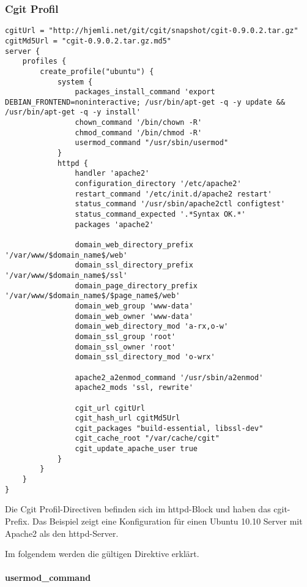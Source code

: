 \subsubsection{Cgit Profil}

\begin{lstlisting}[style=Java, caption=Beispiel Cgit Profil]
cgitUrl = "http://hjemli.net/git/cgit/snapshot/cgit-0.9.0.2.tar.gz"
cgitMd5Url = "cgit-0.9.0.2.tar.gz.md5"
server {
    profiles {
        create_profile("ubuntu") {
            system {
                packages_install_command 'export DEBIAN_FRONTEND=noninteractive; /usr/bin/apt-get -q -y update && /usr/bin/apt-get -q -y install'
                chown_command '/bin/chown -R'
                chmod_command '/bin/chmod -R'
                usermod_command "/usr/sbin/usermod"
            }
            httpd {
                handler 'apache2'
                configuration_directory '/etc/apache2'
                restart_command '/etc/init.d/apache2 restart'
                status_command '/usr/sbin/apache2ctl configtest'
                status_command_expected '.*Syntax OK.*'
                packages 'apache2'

                domain_web_directory_prefix '/var/www/$domain_name$/web'
                domain_ssl_directory_prefix '/var/www/$domain_name$/ssl'
                domain_page_directory_prefix '/var/www/$domain_name$/$page_name$/web'
                domain_web_group 'www-data'
                domain_web_owner 'www-data'
                domain_web_directory_mod 'a-rx,o-w'
                domain_ssl_group 'root'
                domain_ssl_owner 'root'
                domain_ssl_directory_mod 'o-wrx'

                apache2_a2enmod_command '/usr/sbin/a2enmod'
                apache2_mods 'ssl, rewrite'

                cgit_url cgitUrl
                cgit_hash_url cgitMd5Url
                cgit_packages "build-essential, libssl-dev"
                cgit_cache_root "/var/cache/cgit"
                cgit_update_apache_user true
            }
        }
    }
}
\end{lstlisting}

Die Cgit Profil-Directiven befinden sich im httpd-Block und haben das
cgit-Prefix. Das Beispiel zeigt eine Konfiguration für einen Ubuntu 10.10 Server
mit Apache2 als den httpd-Server.

Im folgendem werden die gültigen Direktive erklärt.

\paragraph{usermod\_command}

